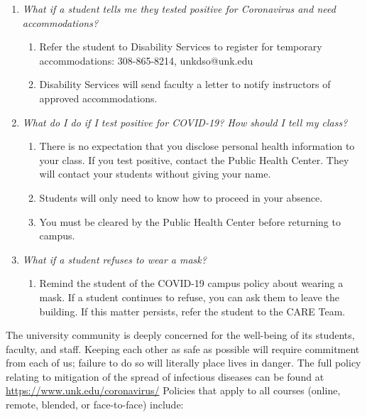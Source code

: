 \documentclass[12pt]{article}
\newcounter{ex}\setcounter{ex}{0}
\begin{document}
\begin{enumerate}
\item \emph{What if a student tells me they tested positive for Coronavirus and need accommodations?}
\begin{enumerate}
\item	Refer the student to Disability Services to register for temporary accommodations: 308-865-8214, unkdso@unk.edu
\item 	Disability Services will send faculty a letter to notify instructors of approved accommodations.
\end{enumerate}

\item \emph{What do I do if I test positive for COVID-19? How should I tell my class?}
\begin{enumerate}
\item	There is no expectation that you disclose personal health information to your class.  If you test positive, contact the Public Health Center. They will contact your students without giving your name.
\item	Students will only need to know how to proceed in your absence.
\item	You must be cleared by the Public Health Center before returning to campus.
\end{enumerate}

\item \emph{What if a student refuses to wear a mask?}
\begin{enumerate}
\item	Remind the student of the COVID-19 campus policy about wearing a mask. If a student continues to refuse, you can ask them to leave the building. If this matter persists, refer the student to the CARE Team.
\end{enumerate}
\end{enumerate}
 The university community is deeply concerned for the well-being of its students, faculty, and staff. Keeping each other as safe as possible will require commitment from each of us; failure to do so will literally place lives in danger. The full policy relating to mitigation of the spread of infectious diseases can be found at \url{https://www.unk.edu/coronavirus/} Policies that apply to all courses (online, remote, blended, or face-to-face) include:
\end{document}
